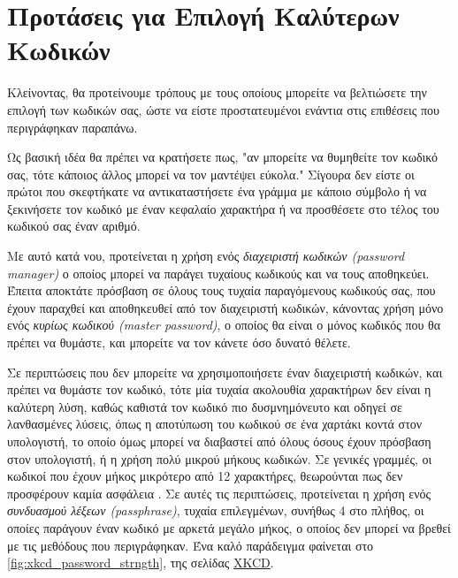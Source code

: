 \documentclass[11pt]{article}
\begin{document}
\section{Προτάσεις για Επιλογή Καλύτερων Κωδικών}

Κλείνοντας, θα προτείνουμε τρόπους με τους οποίους μπορείτε να βελτιώσετε την επιλογή των κωδικών σας, ώστε να είστε προστατευμένοι ενάντια στις επιθέσεις που περιγράφηκαν παραπάνω.

Ως βασική ιδέα θα πρέπει να κρατήσετε πως, "αν μπορείτε να θυμηθείτε τον κωδικό σας, τότε κάποιος άλλος μπορεί να τον μαντέψει εύκολα." Σίγουρα δεν είστε οι πρώτοι που σκεφτήκατε να αντικαταστήσετε ένα γράμμα με κάποιο σύμβολο ή να ξεκινήσετε τον κωδικό με έναν κεφαλαίο χαρακτήρα ή να προσθέσετε στο τέλος του κωδικού σας έναν αριθμό.

Με αυτό κατά νου, προτείνεται η χρήση ενός \textit{διαχειριστή κωδικών (password manager)} ο οποίος μπορεί να παράγει τυχαίους κωδικούς και να τους αποθηκεύει. Έπειτα αποκτάτε πρόσβαση σε όλους τους τυχαία παραγόμενους κωδικούς σας, που έχουν παραχθεί και αποθηκευθεί από τον διαχειριστή κωδικών, κάνοντας χρήση μόνο ενός \textit{κυρίως κωδικού (master password)}, ο οποίος θα είναι ο μόνος κωδικός που θα πρέπει να θυμάστε, και μπορείτε να τον κάνετε όσο δυνατό θέλετε.

Σε περιπτώσεις που δεν μπορείτε να χρησιμοποιήσετε έναν διαχειριστή κωδικών, και πρέπει να θυμάστε τον κωδικό, τότε μία τυχαία ακολουθία χαρακτήρων δεν είναι η καλύτερη λύση, καθώς καθιστά τον κωδικό πιο δυσμνημόνευτο και οδηγεί σε λανθασμένες λύσεις, όπως η αποτύπωση του κωδικού σε ένα χαρτάκι κοντά στον υπολογιστή, το οποίο όμως μπορεί να διαβαστεί από όλους όσους έχουν πρόσβαση στον υπολογιστή, ή η χρήση πολύ μικρού μήκους κωδικών. Σε γενικές γραμμές, οι κωδικοί που έχουν μήκος μικρότερο από 12 χαρακτήρες, θεωρούνται πως δεν προσφέρουν καμία ασφάλεια \cite{wiki:password_strength}. Σε αυτές τις περιπτώσεις, προτείνεται η χρήση ενός \textit{συνδυασμού λέξεων (passphrase)}, τυχαία επιλεγμένων, συνήθως 4 στο πλήθος, οι οποίες παράγουν έναν κωδικό με αρκετά μεγάλο μήκος, ο οποίος δεν μπορεί να βρεθεί με τις μεθόδους που περιγράφηκαν. Ένα καλό παράδειγμα φαίνεται στο \autoref{fig:xkcd_password_strngth}, της σελίδας \href{https://xkcd.com/936/}{XKCD}.
\end{document}
